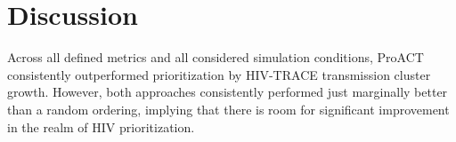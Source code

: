 \documentclass[twocolumn]{bmcart}%
\begin{document}
\section*{Discussion}
Across all defined metrics and all considered simulation conditions, ProACT consistently outperformed prioritization by HIV-TRACE transmission cluster growth. However, both approaches consistently performed just marginally better than a random ordering, implying that there is room for significant improvement in the realm of HIV prioritization.

\end{document}
